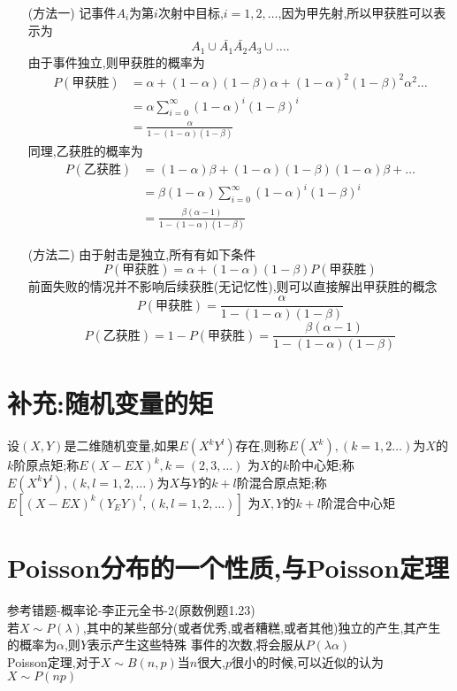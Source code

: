 \documentclass[12pt, a4paper, oneside, UTF8]{ctexbook}
\begin{document}
    \begin{solution}
        \begin{enumerate}
        \item [(方法一)]
        记事件$A_i$为第$i$次射中目标,$i=1,2,\ldots$,因为甲先射,所以甲获胜可以表示为 
        \[
        A_1\cup\bar{A_1}\bar{A_2}A_3\cup\ldots.
        \]
        由于事件独立,则甲获胜的概率为
        \begin{align*}
        P(\text{甲获胜}) 
        &= \alpha + (1-\alpha)(1-\beta)\alpha + (1-\alpha)^2(1-\beta)^2\alpha^2\ldots \\ 
        &= \alpha \sum_{i=0}^{\infty}(1-\alpha)^{i}(1-\beta)^i \\
        &= \frac{\alpha}{1- (1-\alpha)(1-\beta)}
        \end{align*}
        同理,乙获胜的概率为
        \begin{align*}
        P(\text{乙获胜}) 
        &= (1-\alpha)\beta + (1-\alpha)(1-\beta)(1-\alpha)\beta+\ldots \\ 
        &= \beta(1-\alpha)\sum_{i=0}^{\infty}(1-\alpha)^i(1-\beta)^i \\
        &= \frac{\beta(\alpha-1)}{1- (1-\alpha)(1-\beta)}
        \end{align*}
        \item [(方法二)]
        由于射击是独立,所有有如下条件
        \[
        P(\text{甲获胜})=\alpha + (1-\alpha)(1-\beta)P(\text{甲获胜}) 
        \]
        前面失败的情况并不影响后续获胜(无记忆性),则可以直接解出甲获胜的概念
        \[
        P(\text{甲获胜})= \frac{\alpha}{1- (1-\alpha)(1-\beta)}
        \]
        \[
        P(\text{乙获胜}) = 1 - P(\text{甲获胜}) = \frac{\beta(\alpha-1)}{1- (1-\alpha)(1-\beta)}
        \]
        \end{enumerate}
    \end{solution}
\section{补充:随机变量的矩}
    设$(X,Y)$是二维随机变量,如果$E(X^kY^l)$存在,则称$E(X^k),(k=1,2\ldots)$为$X$的$k$阶原点矩;称$E(X-EX)^k,k=(2,3,\ldots)$
    为$X$的$k$阶中心矩;称$E(X^kY^l),(k,l=1,2,\ldots)$为$X$与$Y$的$k+l$阶混合原点矩;称$E[(X-EX)^k(Y_EY)^l,(k,l=1,2,\ldots)]$
    为$X,Y$的$k+l$阶混合中心矩 

\section{Poisson分布的一个性质,与Poisson定理}
参考错题-概率论-李正元全书-2(原数例题1.23) \\
若$X\sim P(\lambda)$,其中的某些部分(或者优秀,或者糟糕,或者其他)独立的产生,其产生的概率为$\alpha$,则$Y$表示产生这些特殊
事件的次数,将会服从$P(\lambda\alpha)$ \\
Poisson定理,对于$X\sim B(n, p)$当$n$很大,$p$很小的时候,可以近似的认为$X\sim P(np)$
\end{document}
